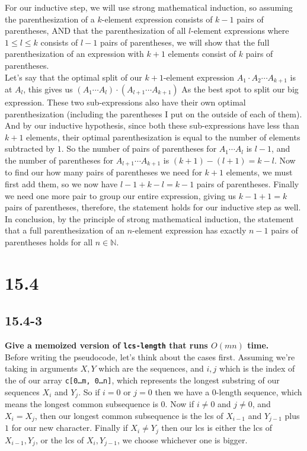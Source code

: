 \documentclass[11pt]{article}
\begin{document}
 For our inductive step, we will use strong mathematical induction, so assuming the 
 parenthesization of a $k$-element expression consists of  $k-1$ pairs of parentheses, AND that 
 the parenthesization of all $l$-element expressions where $1 \leq l \leq k$ consists of $l-1$ 
 pairs of parentheses, we will show that the full parenthesization of an expression with $k+1$ 
 elements consist of $k$ pairs of parentheses. \\ 

 Let's say that the optimal split of our $k+1$-element expression $A_1 \cdot A_2 \cdots A_{k+1}$ 
 is at $A_l$, this gives us $(A_1 \cdots A_l)\cdot(A_{l+1} \cdots A_{k+1})$ As the best spot to 
 split our big expression.  These two sub-expressions also have their own optimal parenthesization 
 (including the parentheses I put on the outside of each of them).  And by our inductive hypothesis, 
 since both these sub-expressions have less than $k+1$ elements, their optimal parenthesization is 
 equal to the number of elements subtracted by $1$.  So the number of pairs of parentheses for 
 $A_1 \cdots A_l$ is $l-1$, and the number of parentheses for $A_{l+1} \cdots A_{k+1}$ is 
 $(k+1)-(l+1) = k-l$.  Now to find our how many pairs of parentheses we need for $k+1$ elements, 
 we must first add them, so we now have $l-1+k-l=k-1$ pairs of parentheses.  Finally we need one 
 more pair to group our entire expression, giving us $k-1+1=k$ pairs of parentheses, therefore, 
 the statement holds for our inductive step as well. \\

 In conclusion, by the principle of strong mathematical induction, the statement that a full 
 parenthesization of an $n$-element expression has exactly $n-1$ pairs of parentheses holds 
 for all $n \in \mathbb{N}$.
 \newpage

 \section*{15.4}
 \subsection*{15.4-3}
 \textbf{Give a memoized version of \texttt{lcs-length} that runs $O(mn)$ time.} \\

 Before writing the pseudocode, let's think about the cases first.  Assuming we're taking in 
 arguments $X,Y$ which are the sequences, and $i,j$ which is the index of the of our array 
 \texttt{c[0\dots m, 0\dots n]}, which represents the longest substring of our sequences $X_i$ 
 and $Y_j$.  So if $i=0$ or $j=0$ then we have a $0$-length sequence, which means the longest 
 common subsequence is $0$.  Now if $i \neq 0$ and $j \neq 0$, and $X_i = X_j$, then our longest 
 common subsequence is the lcs of $X_{i-1}$ and $Y_{j-1}$ plus $1$ for our new character.  
 Finally if $X_i \neq Y_j$ then our lcs is either the lcs of $X_{i-1}, Y_j$, or the lcs of 
 $X_i, Y_{j-1}$, we choose whichever one is bigger.  \\
\end{document}
